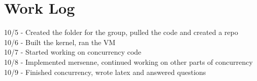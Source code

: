 \documentclass[onecolumn, draftclsnofoot,10pt, compsoc]{IEEEtran}
\begin{document}
\section{Work Log}

	10/5 - Created the folder for the group, pulled the code and created a repo \\
	10/6 - Built the kernel, ran the VM \\
	10/7 - Started working on concurrency code \\
	10/8 - Implemented mersenne, continued working on other parts of concurrency\\
	10/9 - Finished concurrency, wrote latex and answered questions\\
\end{document}
